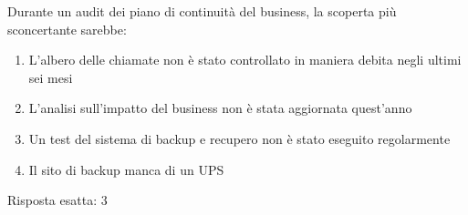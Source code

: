 \begin{Exercise} [
  title={Domanda su BCP},
  label={bcdr5}
 ]
 
 \Question Durante un audit dei piano di continuità del business, la scoperta 
 più sconcertante sarebbe:
 \begin{enumerate}
   \item L'albero delle chiamate non è stato controllato in maniera debita 
   negli ultimi sei mesi
   \item L'analisi sull'impatto del business non è stata aggiornata quest'anno
   \item Un test del sistema di backup e recupero non è stato eseguito 
   regolarmente
   \item Il sito di backup manca di un UPS
 \end{enumerate}
  
\end{Exercise}

\begin{Answer} [
  ref={bcdr5},
  number={5}
 ]
 
 \Question Risposta esatta: 3
 
\end{Answer}